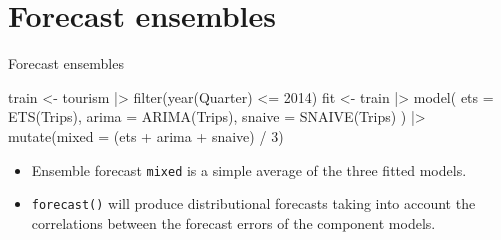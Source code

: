 \documentclass[
  14pt,
  ignorenonframetext,
  aspectratio=169,
]{beamer}
\newenvironment{Shaded}{\begin{snugshade}}{\end{snugshade}}
\newcommand{\AttributeTok}[1]{\textcolor[rgb]{0.77,0.63,0.00}{#1}}
\newcommand{\DecValTok}[1]{\textcolor[rgb]{0.00,0.00,0.81}{#1}}
\newcommand{\FunctionTok}[1]{\textcolor[rgb]{0.00,0.00,0.00}{#1}}
\newcommand{\NormalTok}[1]{\textcolor[rgb]{0.00,0.00,0.00}{#1}}
\newcommand{\OtherTok}[1]{\textcolor[rgb]{0.56,0.35,0.01}{#1}}
\newcommand{\SpecialCharTok}[1]{\textcolor[rgb]{0.00,0.00,0.00}{#1}}
\providecommand{\tightlist}{%
  \setlength{\itemsep}{0pt}\setlength{\parskip}{0pt}}\usepackage{longtable,booktabs,array}
\renewenvironment{Shaded}{\vspace*{0.15cm}\color{black}\fontsize{10}{10}\sf\begin{snugshade}\color{black}}{\end{snugshade}}
\begin{document}
\hypertarget{forecast-ensembles}{%
\section{Forecast ensembles}\label{forecast-ensembles}}

\begin{frame}[fragile]{Forecast ensembles}
\protect\hypertarget{forecast-ensembles-1}{}
\fontsize{10}{11}\sf

\begin{Shaded}
\begin{Highlighting}[]
\NormalTok{train }\OtherTok{\textless{}{-}}\NormalTok{ tourism }\SpecialCharTok{|\textgreater{}}
  \FunctionTok{filter}\NormalTok{(}\FunctionTok{year}\NormalTok{(Quarter) }\SpecialCharTok{\textless{}=} \DecValTok{2014}\NormalTok{)}
\NormalTok{fit }\OtherTok{\textless{}{-}}\NormalTok{ train }\SpecialCharTok{|\textgreater{}}
  \FunctionTok{model}\NormalTok{(}
    \AttributeTok{ets =} \FunctionTok{ETS}\NormalTok{(Trips),}
    \AttributeTok{arima =} \FunctionTok{ARIMA}\NormalTok{(Trips),}
    \AttributeTok{snaive =} \FunctionTok{SNAIVE}\NormalTok{(Trips)}
\NormalTok{  ) }\SpecialCharTok{|\textgreater{}}
  \FunctionTok{mutate}\NormalTok{(}\AttributeTok{mixed =}\NormalTok{ (ets }\SpecialCharTok{+}\NormalTok{ arima }\SpecialCharTok{+}\NormalTok{ snaive) }\SpecialCharTok{/} \DecValTok{3}\NormalTok{)}
\end{Highlighting}
\end{Shaded}

\fontsize{13}{14}\sf

\begin{itemize}
\tightlist
\item
  Ensemble forecast \texttt{mixed} is a simple average of the three
  fitted models.
\item
  \texttt{forecast()} will produce distributional forecasts taking into
  account the correlations between the forecast errors of the component
  models.
\end{itemize}
\end{frame}
\end{document}
